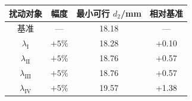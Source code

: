 \begin{tabular}{cccc}
  \toprule
    扰动对象 & 幅度 & 最小可行 $d_2$/\si{mm} & 相对基准 \\
  \midrule
    基准 & --- & 18.18 & --- \\
    $\lambda_{\mathrm{I}}$ & $+5\%$ & 18.28 & +0.10 \\
    $\lambda_{\mathrm{II}}$ & $+5\%$ & 18.76 & +0.57 \\
    $\lambda_{\mathrm{III}}$ & $+5\%$ & 18.76 & +0.57 \\
    $\lambda_{\mathrm{IV}}$ & $+5\%$ & 19.57 & +1.38 \\
  \bottomrule
\end{tabular}
